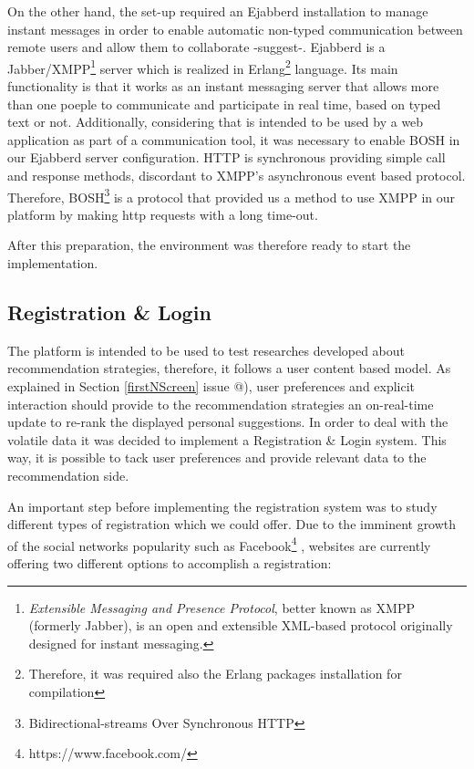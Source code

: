 \documentclass{acm_proc_article-sp}
\makeatletter
\newcommand*{\rom}[1]{\expandafter\@slowromancap\romannumeral #1@}
\makeatother
\begin{document}
On the other hand, the set-up required an Ejabberd installation to manage instant messages in order to enable automatic non-typed communication between remote users and allow them to collaborate -suggest-. Ejabberd is a Jabber/XMPP\footnote{\textit{Extensible Messaging and Presence Protocol}, better known as XMPP (formerly Jabber), is an open and extensible XML-based protocol originally designed for instant messaging.} server \cite{jia2010xmpp} which is realized in Erlang\footnote{Therefore, it was required also the Erlang packages installation for compilation} language. Its main functionality is that it works as an instant messaging server that allows more than one poeple to communicate and participate in real time, based on typed text or not. Additionally, considering that is intended to be used by a web application as part of a communication tool, it was necessary to enable BOSH in our Ejabberd server configuration. HTTP is synchronous providing simple call and response methods, discordant to XMPP's asynchronous event based protocol. Therefore, BOSH\footnote{Bidirectional-streams Over Synchronous HTTP} is a protocol that provided us a method to use XMPP in our platform by making http requests with a long time-out.

After this preparation, the environment was therefore ready to start the implementation. 
\subsection{Registration \& Login}

The platform is intended to be used to test researches developed about recommendation strategies, therefore, it follows a user content based model. As explained in Section \ref{firstNScreen} issue \rom{1}), user preferences and explicit interaction should provide to the recommendation strategies an on-real-time update to re-rank the displayed personal suggestions. In order to deal with the volatile data it was decided to implement a Registration \& Login system. This way, it is possible to tack user preferences and provide relevant data to the recommendation side. 

An important step before implementing the registration system was to study different types of registration which we could offer. Due to the imminent growth of the social networks popularity such as Facebook\footnote{https://www.facebook.com/} \cite{shih2009facebook}, websites are currently offering two different options to accomplish a registration:
\end{document}

